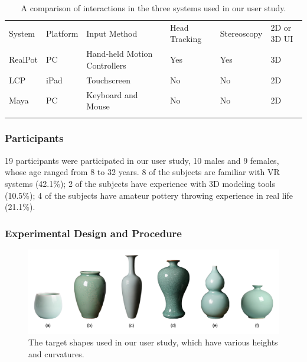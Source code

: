 \begin{table}
\caption{A comparison of interactions in the three systems used in our user study.}
\label{tab:33}       %
\begin{tabular}{llllll}
\hline\noalign{\smallskip}
System & Platform & Input Method & Head Tracking & Stereoscopy & 2D or 3D UI \\
\noalign{\smallskip}\hline\noalign{\smallskip}
RealPot & PC & Hand-held Motion Controllers & Yes & Yes & 3D \\
LCP & iPad & Touchscreen & No & No & 2D \\
Maya & PC & Keyboard and Mouse & No & No & 2D \\
\noalign{\smallskip}\hline
\end{tabular}
\end{table}

\subsubsection{Participants}
19 participants were participated in our user study, 10 males and 9 females, whose age ranged from 8 to 32 years. 8 of the subjects are familiar with VR systems (42.1\%); 2 of the subjects have experience with 3D modeling tools (10.5\%); 4 of the subjects have amateur pottery throwing experience in real life (21.1\%).

\subsubsection{Experimental Design and Procedure}

\begin{figure}
\includegraphics[width=\textwidth]{fig12}
\caption{The target shapes used in our user study, which have various heights and curvatures.}
\label{fig:target}
\end{figure}

